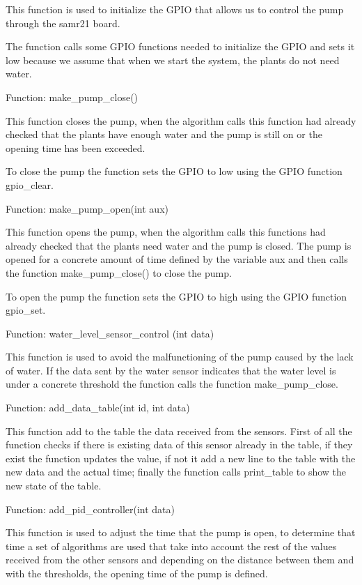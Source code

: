 \documentclass[11pt,paper=a4,parskip=half]{scrartcl}
\begin{document}
This function is used to initialize the GPIO that allows us to control the pump
through the samr21 board.

The function calls some GPIO functions needed to initialize the GPIO and sets
it low because we assume that when we start the system, the plants do not need
water.

Function: make\_pump\_close()

This function closes the pump, when the algorithm calls this function had
already checked that the plants have enough water and the pump is still on or
the opening time has been exceeded.

To close the pump the function sets the GPIO to low using the GPIO function
gpio\_clear.

Function: make\_pump\_open(int aux)

This function opens the pump, when the algorithm calls this functions had
already checked that the plants need water and the pump is closed. The pump is
opened for a concrete amount of time defined by the variable aux and then calls
the function make\_pump\_close() to close the pump.

To open the pump the function sets the GPIO to high using the GPIO function
gpio\_set.

Function: water\_level\_sensor\_control (int data)

This function is used to avoid the malfunctioning of the pump caused by the
lack of water. If the data sent by the water sensor indicates that the water
level is under a concrete threshold the function calls the function
make\_pump\_close.

Function: add\_data\_table(int id, int data)

This function add to the table the data received from the sensors. First of all the function checks if there is existing data of this sensor already in the table, if they exist the function updates the value, if not it add a new line to the table with the new data and the actual time; finally the function calls print\_table to show the new state of the table.

Function: add\_pid\_controller(int data)

This function is used to adjust the time that the pump is open, to determine
that time a set of algorithms are used that take into account the rest of the
values received from the other sensors and depending on the distance between
them and with the thresholds, the opening time of the pump is defined.
\end{document}
